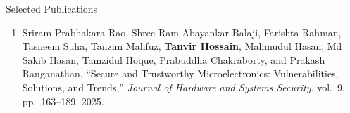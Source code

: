 \begin{rSection}{Selected Publications}
\begin{enumerate}[itemsep=0.05em, leftmargin=1.5em, topsep=0.2em, font=\color{accent}\bfseries]
    \item Sriram Prabhakara Rao, Shree Ram Abayankar Balaji, Farishta Rahman, Tasneem Suha, Tanzim Mahfuz, \textbf{Tanvir Hossain}, Mahmudul Hasan, Md Sakib Hasan, Tamzidul Hoque, Prabuddha Chakraborty, and Prakash Ranganathan, ``Secure and Trustworthy Microelectronics: Vulnerabilities, Solutions, and Trends,'' \emph{Journal of Hardware and Systems Security}, vol.\ 9, pp.\ 163--189, 2025. 
\end{enumerate}

\end{rSection}
